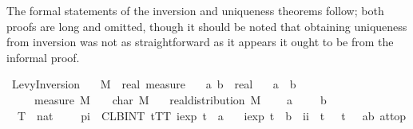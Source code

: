 \documentclass{article}
\theoremstyle{definition}
\begin{document}
\medskip

The formal statements of the inversion and uniqueness theorems follow; both proofs are long and omitted, though it should be noted that obtaining uniqueness from inversion was not as straightforward as it appears it ought to be from the informal proof.

\medskip

\begin{isabellebody}
\isamarkupfalse%
\ Levy{\isacharunderscore}Inversion{\isacharcolon}\isanewline
\ \ \ M\ {\isacharcolon}{\isacharcolon}\ {\isachardoublequoteopen}real\ measure{\isachardoublequoteclose}\isanewline
\ \ \ a\ b\ {\isacharcolon}{\isacharcolon}\ real\isanewline
\ \ \ {\isachardoublequoteopen}a\ {\isasymle}\ b{\isachardoublequoteclose}\isanewline
\ \ \ {\isachardoublequoteopen}{\isasymmu}\ {\isasymequiv}\ measure\ M{\isachardoublequoteclose}\ \ {\isachardoublequoteopen}{\isasymphi}\ {\isasymequiv}\ char\ M{\isachardoublequoteclose}\isanewline
\ \ \ {\isachardoublequoteopen}real{\isacharunderscore}distribution\ M{\isachardoublequoteclose}\isanewline
\ \ \ {\isachardoublequoteopen}{\isasymmu}\ {\isacharbraceleft}a{\isacharbraceright}\ {\isacharequal}\ {}{\isachardoublequoteclose}\ \ {\isachardoublequoteopen}{\isasymmu}\ {\isacharbraceleft}b{\isacharbraceright}\ {\isacharequal}\ {}{\isachardoublequoteclose}\isanewline
\ \ \isanewline
\ \ {\isachardoublequoteopen}{\isacharparenleft}{\isacharparenleft}{\isasymlambda}T\ {\isacharcolon}{\isacharcolon}\ nat{\isachardot}\ {}\ {\isacharslash}\ {\isacharparenleft}{}\ {\isacharasterisk}\ pi{\isacharparenright}\ {\isacharasterisk}\ {\isacharparenleft}CLBINT\ t{\isacharequal}{\isacharminus}T{\isachardot}{\isachardot}T{\isachardot}\ {\isacharparenleft}iexp\ {\isacharparenleft}{\isacharminus}{\isacharparenleft}t\ {\isacharasterisk}\ a{\isacharparenright}{\isacharparenright}\ {\isacharminus}\isanewline
\ \ iexp\ {\isacharparenleft}{\isacharminus}{\isacharparenleft}t\ {\isacharasterisk}\ b{\isacharparenright}{\isacharparenright}{\isacharparenright}\ {\isacharslash}\ {\isacharparenleft}ii\ {\isacharasterisk}\ t{\isacharparenright}\ {\isacharasterisk}\ {\isasymphi}\ t{\isacharparenright}{\isacharparenright}\ {\isacharminus}{\isacharminus}{\isacharminus}{\isachargreater}\ {\isasymmu}\ {\isacharbraceleft}a{\isacharless}{\isachardot}{\isachardot}b{\isacharbraceright}{\isacharparenright}\ at{\isacharunderscore}top{\isachardoublequoteclose}\isanewline

\end{isabellebody}
\end{document}
